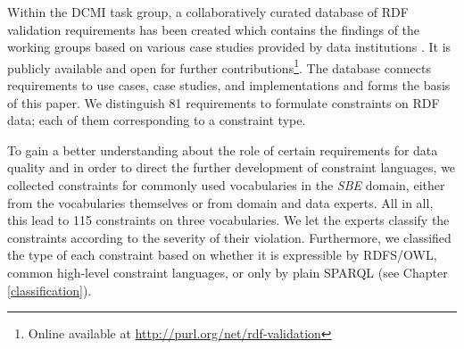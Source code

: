 \documentclass[conference]{IEEEtran}
\begin{document}
Within the DCMI task group, a collaboratively curated database of RDF validation requirements has been created which contains the findings of the working groups based on various case studies provided by data institutions \cite{BoschEckert2014}. It is publicly available and open for further contributions\footnote{Online available at \url{http://purl.org/net/rdf-validation}}.
The database connects requirements to use cases, case studies, and implementations and forms the basis of this paper. 
We distinguish 81 requirements to formulate constraints on RDF data; 
each of them corresponding to a constraint type.

To gain a better understanding about the role of certain requirements for data quality and in order to direct the further development of constraint languages, we collected constraints for commonly used vocabularies in the \emph{SBE} domain, either from the vocabularies themselves or from domain and data experts. All in all, this lead to 115 constraints on three vocabularies. 
We let the experts classify the constraints according to the severity of their violation. Furthermore, we classified the type of each constraint based on whether it is expressible by RDFS/OWL, common high-level constraint languages, or only by plain SPARQL (see Chapter \ref{classification}).
\end{document}
